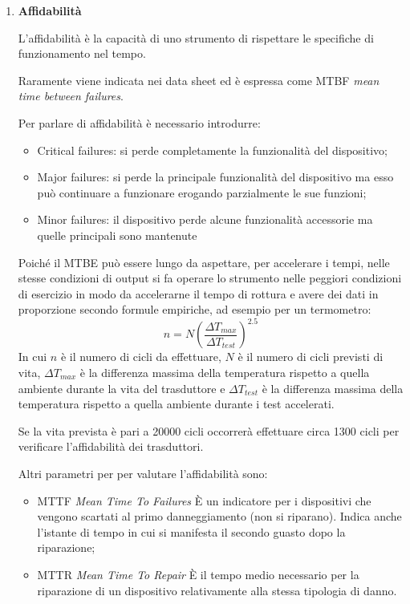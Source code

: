 \documentclass[a4paper, 15pt]{article}
\begin{document}
\begin{adjustwidth}{2in}{}
\begin{enumerate}
\item \textbf{Affidabilità} 

	L'affidabilità è la capacità di uno strumento di rispettare le specifiche di
	funzionamento nel tempo.
	
	Raramente viene indicata nei data sheet ed è espressa come MTBF \textit{mean
	time between failures}. \newline
	
	Per parlare di affidabilità è necessario introdurre:
	\begin{itemize}
		\item Critical failures: si perde completamente la funzionalità del dispositivo;
		\item Major failures: si perde la principale funzionalità del dispositivo ma esso può
		continuare a funzionare erogando parzialmente le sue funzioni;
		\item Minor failures: il dispositivo perde alcune funzionalità accessorie ma quelle
		principali sono mantenute
	\end{itemize}
	Poiché il MTBE può essere lungo da aspettare, per accelerare i tempi, nelle stesse condizioni di output si fa operare lo strumento nelle peggiori condizioni di esercizio in modo da accelerarne il tempo di rottura e avere dei dati in proporzione secondo formule empiriche, ad esempio per un termometro:
	\[n = N\left( \dfrac{\Delta T_{max}}{\Delta T_{test}}\right)^{2.5} \] 
	In cui $n$ è il numero di cicli da effettuare, $N$ è il numero di cicli previsti di vita, $\Delta T_{max}$  è la differenza massima della temperatura rispetto a quella ambiente
	durante la vita del trasduttore e $\Delta T_{test}$ è la differenza massima della temperatura rispetto a quella ambiente
	durante i test accelerati.\newline 
	
	Se la vita prevista è pari a 20000 cicli occorrerà effettuare circa 1300 cicli per
	verificare l'affidabilità dei trasduttori. \newline 
	
	Altri parametri per per valutare l'affidabilità sono: 
	\begin{itemize}
		\item MTTF \textit{Mean Time To Failures} \newline 
		È un indicatore per i dispositivi che vengono scartati al primo danneggiamento (non si
		riparano). Indica anche l’istante di tempo in cui si manifesta il secondo guasto dopo la
		riparazione;
		\item MTTR \textit{Mean Time To Repair} \newline
		È il tempo medio necessario per la riparazione di un dispositivo relativamente alla
		stessa tipologia di danno.\newline 
		

\end{itemize}
\end{enumerate}
\end{adjustwidth}
\end{document}
